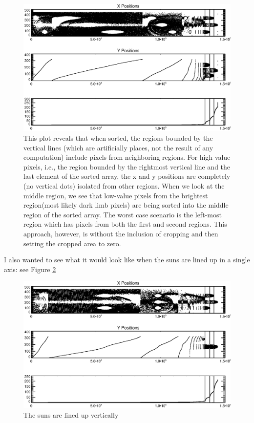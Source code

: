 \documentclass[10pt]{scrartcl}
\begin{document}
\begin{figure}[!ht]
    \centering
    \includegraphics[width=.9\textwidth]{../plots_tables_images/saysitall.eps}
    \caption{This plot reveals that when sorted, the regions bounded by the vertical lines (which are artificially places, not the result of any computation) include pixels from neighboring regions. For high-value pixels, i.e., the region bounded by the rightmost vertical line and the last element of the sorted array, the x and y positions are completely (no vertical dots) isolated from other regions. When we look at the middle region, we see that low-value pixels from the brightest region(most likely dark limb pixels) are being sorted into the middle region of the sorted array. The worst case scenario is the left-most region which has pixels from both the first and second regions. This approach, however, is without the inclusion of cropping and then setting the cropped area to zero.}
    \label{saysitall}
\end{figure}

I also wanted to see what it would look like when the suns are lined up in a single axis: see Figure \ref{inaline}

\begin{figure}[!ht]
    \centering
    \includegraphics[width=.9\textwidth]{../plots_tables_images/inaline.eps}
    \caption{The suns are lined up vertically}
    \label{inaline}
\end{figure}
\end{document}
